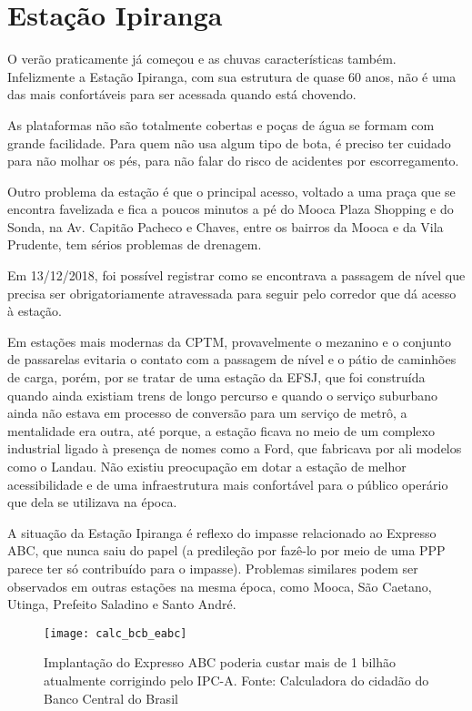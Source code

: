 \documentclass[11pt,fleqn]{book} %
\begin{document}
\section{Estação Ipiranga}

O verão praticamente já começou e as chuvas características também. Infelizmente a Estação Ipiranga, com sua estrutura de quase 60 anos, não é uma das mais confortáveis para ser acessada quando está chovendo.

As plataformas não são totalmente cobertas e poças de água se formam com grande facilidade. Para quem não usa algum tipo de bota, é preciso ter cuidado para não molhar os pés, para não falar do risco de acidentes por escorregamento.

Outro problema da estação é que o principal acesso, voltado a uma praça que se encontra favelizada e fica a poucos minutos a pé do Mooca Plaza Shopping e do Sonda, na Av. Capitão Pacheco e Chaves, entre os bairros da Mooca e da Vila Prudente, tem sérios problemas de drenagem.

Em 13/12/2018, foi possível registrar como se encontrava a passagem de nível que precisa ser obrigatoriamente atravessada para seguir pelo corredor que dá acesso à estação.

Em estações mais modernas da CPTM, provavelmente o mezanino e o conjunto de passarelas evitaria o contato com a passagem de nível e o pátio de caminhões de carga, porém, por se tratar de uma estação da EFSJ, que foi construída quando ainda existiam trens de longo percurso e quando o serviço suburbano ainda não estava em processo de conversão para um serviço de metrô, a mentalidade era outra, até porque, a estação ficava no meio de um complexo industrial ligado à presença de nomes como a Ford, que fabricava por ali modelos como o Landau. Não existiu preocupação em dotar a estação de melhor acessibilidade e de uma infraestrutura mais confortável para o público operário que dela se utilizava na época.

A situação da Estação Ipiranga é reflexo do impasse relacionado ao Expresso ABC, que nunca saiu do papel (a predileção por fazê-lo por meio de uma PPP parece ter só contribuído para o impasse). Problemas similares podem ser observados em outras estações na mesma época, como Mooca, São Caetano, Utinga, Prefeito Saladino e Santo André.

\begin{figure}[htb]
	\centering
	\texttt{[image: calc\_bcb\_eabc]}
	\caption[Valor corrigido do Expresso ABC]{Implantação do Expresso ABC poderia custar mais de 1 bilhão atualmente corrigindo pelo IPC-A. Fonte: Calculadora do cidadão do Banco Central do Brasil}
	\label{fig:calc_bcb_eabc}
\end{figure}
\end{document}

